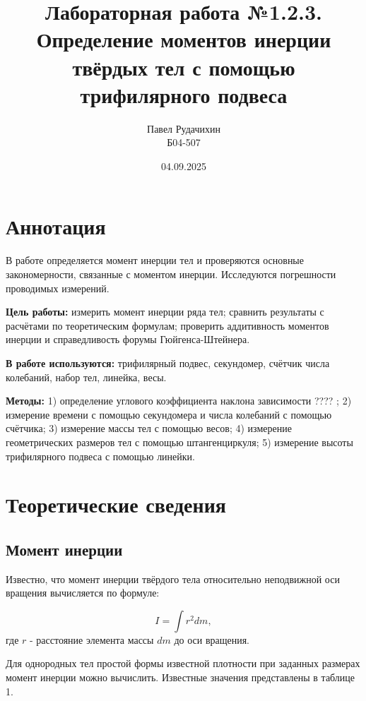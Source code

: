 \documentclass{report}
\title{Лабораторная работа №1.2.3. \\ Определение моментов инерции твёрдых тел с помощью трифилярного подвеса}
\author{Павел Рудачихин \\ Б04-507}
\date{04.09.2025}
\begin{document}
	\maketitle{}
	\section* {Аннотация} 
	
	\hspace{4mm} В работе определяется момент инерции тел и проверяются основные закономерности, связанные с моментом инерции. Исследуются погрешности проводимых измерений.
	
	\textbf{Цель работы:} измерить момент инерции ряда тел; сравнить результаты с расчётами по теоретическим формулам; проверить аддитивность моментов инерции и справедливость форумы Гюйгенса-Штейнера.

	\textbf{В работе используются:} трифилярный подвес, секундомер, счётчик числа колебаний, набор тел, линейка, весы.
	
	\textbf{Методы:} 1) определение  углового  коэффициента  наклона  зависимости ???? ; 2) измерение времени с помощью секундомера и числа колебаний с помощью счётчика; 3) измерение массы тел с помощью весов; 4) измерение геометрических размеров тел с помощью штангенциркуля; 5) измерение высоты трифилярного подвеса с помощью линейки. 
	
		
	\section* {Теоретические сведения}
	\subsection* {Момент инерции}
	
	\hspace{4mm} Известно, что момент инерции твёрдого тела относительно неподвижной оси вращения вычисляется по формуле:
	
	\begin{equation} 
		I = \int r^{2}dm,
	\end{equation}
	где $r$ - расстояние элемента массы $dm$ до оси вращения.
	
	Для однородных тел простой формы известной плотности при заданных размерах момент инерции можно вычислить. Известные значения представлены в таблице 1.
	
\end{document}
